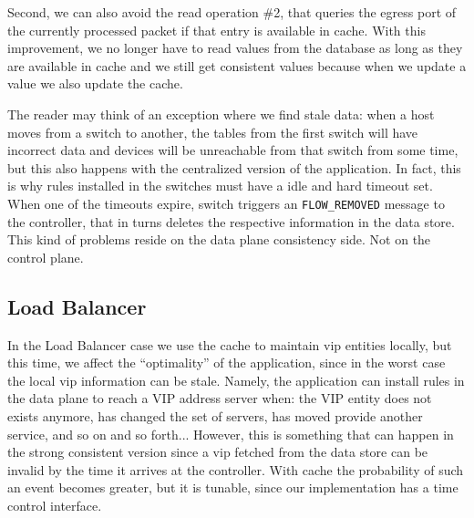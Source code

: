 Second, we can also avoid the read operation \#2, that queries the egress port of the currently processed packet if that entry is available in cache. 
With this improvement, we no longer have to read values from the database as long as they are available in cache and we still get consistent values because when we update a value we also update the cache. 

The reader may think of an exception where we find stale data: when a host moves from a switch to another, the tables from the first switch will have incorrect data and devices will be unreachable from that switch from some time, but this also happens with the centralized version of the application. In fact, this is why rules installed in the switches must have a idle and hard timeout set. When one of the timeouts expire, switch triggers an \texttt{FLOW\_REMOVED} message to the controller, that in turns deletes the respective information in the data store.  This kind of problems reside on the data plane consistency side. Not on the control plane. 




\subsection{Load Balancer}
\label{sec:load-balancer}
In the Load Balancer case we use the cache to maintain \gls{vip} entities locally, but this time, we affect the ``optimality'' of the application, since in the worst case the local \gls{vip} information can be stale.
Namely, the  application can install rules in the data plane to reach a VIP address  server when: the VIP entity does not exists anymore, has changed the set  of servers, has moved provide another service, and so on and so forth... 
However, this is something that can happen in the strong consistent version since a \gls{vip} fetched from the data store can be invalid by the time it arrives at the controller. 
With cache the probability of such an event becomes greater,  but it is tunable,  since our implementation has a time control interface.



